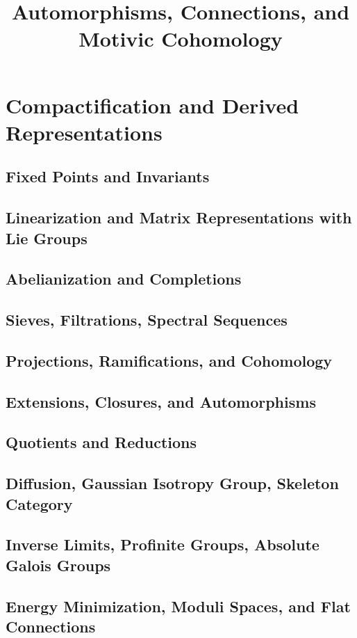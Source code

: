 \documentclass{article}
\title{\vspace{-3cm} Automorphisms, Connections, and Motivic Cohomology}
\author{}
\date{}
\theoremstyle{definition}
\begin{document}
\maketitle
\vspace{-1.5cm}
\tableofcontents
\newpage

\section{Compactification and Derived Representations}
\subsection{Fixed Points and Invariants}
\subsection{Linearization and Matrix Representations with Lie Groups}
\subsection{Abelianization and Completions}
\subsection{Sieves, Filtrations, Spectral Sequences}
\subsection{Projections, Ramifications, and Cohomology}
\subsection{Extensions, Closures, and Automorphisms}
\subsection{Quotients and Reductions}
\subsection{Diffusion, Gaussian Isotropy Group, Skeleton Category}
\subsection{Inverse Limits, Profinite Groups, Absolute Galois Groups}
\subsection{Energy Minimization, Moduli Spaces, and Flat Connections}
\end{document}
